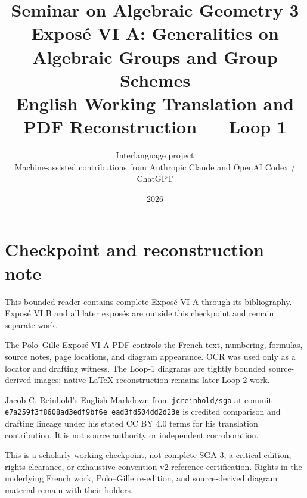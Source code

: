 \documentclass[11pt,a4paper,oneside]{book}
\title{Seminar on Algebraic Geometry 3\\
  \large Expos\'e VI A: Generalities on Algebraic Groups and Group Schemes\\[0.75em]
  \normalsize English Working Translation and PDF Reconstruction --- Loop 1}
\author{Interlanguage project\\
  \small Machine-assisted contributions from Anthropic Claude and OpenAI Codex / ChatGPT}
\date{2026}
\begin{document}
\frontmatter
\maketitle

\chapter*{Checkpoint and reconstruction note}
This bounded reader contains complete Expos\'e VI A through its
bibliography. Expos\'e VI B and all later expos\'es are outside this
checkpoint and remain separate work.

The Polo--Gille Expos\'e-VI-A PDF controls the French text, numbering,
formulas, source notes, page locations, and diagram appearance. OCR was
used only as a locator and drafting witness. The Loop-1 diagrams are
tightly bounded source-derived images; native \LaTeX{} reconstruction
remains later Loop-2 work.

Jacob C. Reinhold's English Markdown from \texttt{jcreinhold/sga} at
commit \texttt{e7a259f3\allowbreak f8608ad3\allowbreak edf9bf6e\allowbreak
ead3fd50\allowbreak 4dd2d23e} is credited
comparison and drafting lineage under his stated CC BY 4.0 terms for
his translation contribution. It is not source authority or independent
corroboration.

This is a scholarly working checkpoint, not complete SGA 3, a critical
edition, rights clearance, or exhaustive convention-v2 reference
certification. Rights in the underlying French work, Polo--Gille
re-edition, and source-derived diagram material remain with their
holders.

\tableofcontents
\mainmatter
\end{document}
